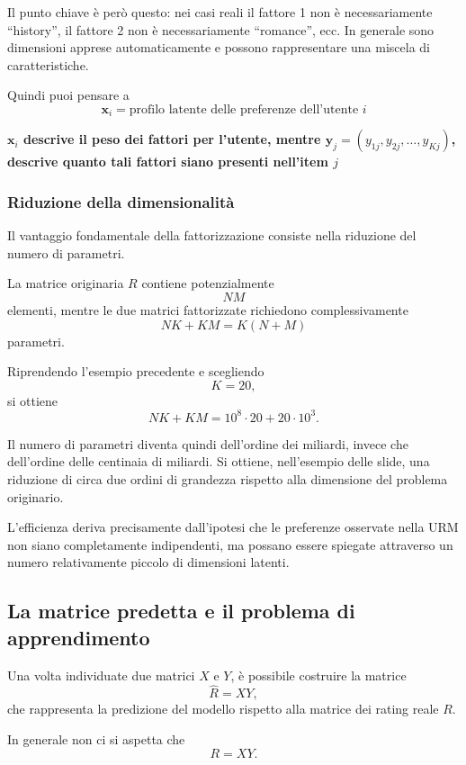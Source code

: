 Il punto chiave è però questo: nei casi reali il fattore 1 non è necessariamente “history”, il fattore 2 non è necessariamente “romance”, ecc. In generale sono dimensioni apprese automaticamente e possono rappresentare una miscela di caratteristiche.

Quindi puoi pensare a
\[
\boxed{\mathbf{x}_i = \text{profilo latente delle preferenze dell'utente } i}
\]

\begin{center}
    \textbf{\(\mathbf{x}_i\) descrive il peso dei fattori per l'utente, mentre \(\mathbf{y}_j=(y_{1j},y_{2j},\dots,y_{Kj})\), descrive quanto tali fattori siano presenti nell'item $j$}
\end{center}

\subsubsection{Riduzione della dimensionalità}

Il vantaggio fondamentale della fattorizzazione consiste nella riduzione del numero di parametri.

La matrice originaria $R$ contiene potenzialmente
\[
NM
\]
elementi, mentre le due matrici fattorizzate richiedono complessivamente
\[
NK + KM
=
K(N+M)
\]
parametri.

Riprendendo l'esempio precedente e scegliendo
\[
K=20,
\]
si ottiene
\[
N K + K M
=
10^8 \cdot 20
+
20 \cdot 10^3.
\]

Il numero di parametri diventa quindi dell'ordine dei miliardi, invece che dell'ordine delle centinaia di miliardi. Si ottiene, nell'esempio delle slide, una riduzione di circa due ordini di grandezza rispetto alla dimensione del problema originario.

L'efficienza deriva precisamente dall'ipotesi che le preferenze osservate nella URM non siano completamente indipendenti, ma possano essere spiegate attraverso un numero relativamente piccolo di dimensioni latenti.

\subsection{La matrice predetta e il problema di apprendimento}

Una volta individuate due matrici $X$ e $Y$, è possibile costruire la matrice
\[
\widehat R = XY,
\]
che rappresenta la predizione del modello rispetto alla matrice dei rating reale $R$.

In generale non ci si aspetta che
\[
R = XY.
\]


